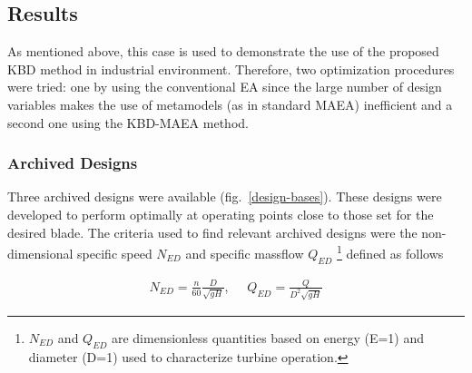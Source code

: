 
\subsection{Results}
As mentioned above, this case is used to demonstrate the use of the proposed KBD method in industrial environment. Therefore, two optimization procedures were tried: one by using the conventional EA since the large number of design variables makes the use of metamodels (as in standard MAEA) inefficient and a second one using the KBD-MAEA method.

\subsubsection{Archived Designs}
Three archived designs were available (fig.\ \ref{design-bases}). These designs were developed to perform optimally at operating points close to those set for the desired blade. The criteria used to find relevant archived designs were the non-dimensional specific speed $N_{ED}$ and specific massflow $Q_{ED}$ \footnote{$N_{ED}$ and $Q_{ED}$ are dimensionless quantities based on energy (E=1) and diameter (D=1) used to characterize turbine operation.} defined as follows 

\begin{eqnarray}
   N_{ED}=\frac{n}{60}\frac{D}{\sqrt{gH}}, ~~~~~~ Q_{ED}=\frac{Q}{D^2 \sqrt{gH}}
   \label{undimFrancis} 
\end{eqnarray}


